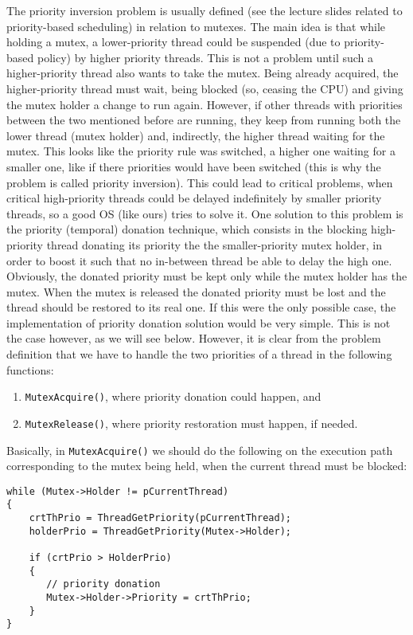 The priority inversion problem is usually defined (see the lecture slides related to priority-based scheduling) in relation to mutexes. The main idea is that while holding a mutex, a lower-priority thread could be suspended (due to priority-based policy) by higher priority threads. This is not a problem until such a higher-priority thread also wants to take the mutex. Being already acquired, the higher-priority thread must wait, being blocked (so, ceasing the CPU) and giving the mutex holder a change to run again. However, if other threads with priorities between the two mentioned before are running, they keep from running both the lower thread (mutex holder) and, indirectly, the higher thread waiting for the mutex. This looks like the priority rule was switched, a higher one waiting for a smaller one, like if there priorities would have been switched (this is why the problem is called priority inversion). This could lead to critical problems, when critical high-priority threads could be delayed indefinitely by smaller priority threads, so a good OS (like ours) tries to solve it. One solution to this problem is the priority (temporal) donation technique, which consists in the blocking high-priority thread donating its priority the the smaller-priority mutex holder, in order to boost it such that no in-between thread be able to delay the high one. Obviously, the donated priority must be kept only while the mutex holder has the mutex. When the mutex is released the donated priority must be lost and the thread should be restored to its real one. If this were the only possible case, the implementation of priority donation solution would be very simple. This is not the case however, as we will see below. However, it is clear from the problem definition that we have to handle the two priorities of a thread in the following functions:
\begin{enumerate}
    \item \lstinline|MutexAcquire()|, where priority donation could happen, and
    \item \lstinline|MutexRelease()|, where priority restoration must happen, if needed.
\end{enumerate}

Basically, in \lstinline|MutexAcquire()| we should do the following on the execution path corresponding to the mutex being held, when the current thread must be blocked:
\begin{lstlisting}
while (Mutex->Holder != pCurrentThread)    
{
    crtThPrio = ThreadGetPriority(pCurrentThread);
    holderPrio = ThreadGetPriority(Mutex->Holder);

    if (crtPrio > HolderPrio)
    {
       // priority donation
       Mutex->Holder->Priority = crtThPrio;
    }
}
\end{lstlisting}

